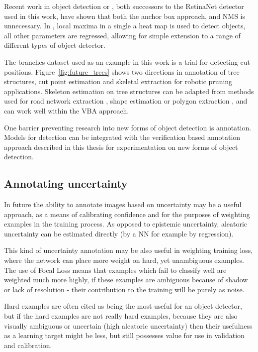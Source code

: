 Recent work in object detection \cite{Zhou2019} or \cite{Law2018}, both successors to the RetinaNet detector \cite{Wang2017} used in this work, have shown that both the anchor box approach, and \gls{NMS} is unnecessary. In \cite{Zhou2019}, local maxima in a single a heat map is used to detect objects, all other parameters are regressed, allowing for simple extension to a range of different types of object detector.

The branches dataset used as an example in this work is a trial for detecting cut positions. Figure~\ref{fig:future_trees} shows two directions in annotation of tree structures, cut point estimation and skeletal extraction for robotic pruning applications. Skeleton estimation on tree structures can be adapted from methods used for road network extraction \cite{Li2018}, shape estimation \cite{Jiang2019a} or polygon extraction \cite{Acuna2018}, and can work well within the \gls{VBA} approach.

One barrier preventing research into new forms of object detection is annotation. Models for detection can be integrated with the verification based annotation approach described in this thesis for experimentation on new forms of object detection.

\subsection{Annotating uncertainty}

In future the ability to annotate images based on uncertainty may be a useful approach, as a means of calibrating confidence and for the purposes of weighting examples in the training process. As opposed to epistemic uncertainty, aleatoric uncertainty can be estimated directly (by a \gls{NN} for example by regression).  

This kind of uncertainty annotation may be also useful in weighting training loss, where the network can place more weight on hard, yet unambiguous examples. The use of Focal Loss means that examples which fail to classify well are weighted much more highly, if these examples are ambiguous because of shadow or lack of resolution - their contribution to the training will be purely as noise.

Hard examples are often cited as being the most useful for an object detector, but if the hard examples are not really hard examples, because they are also visually ambiguous or uncertain (high aleatoric uncertainty) then their usefulness as a learning target might be less, but still possesses value for use in validation and calibration.




